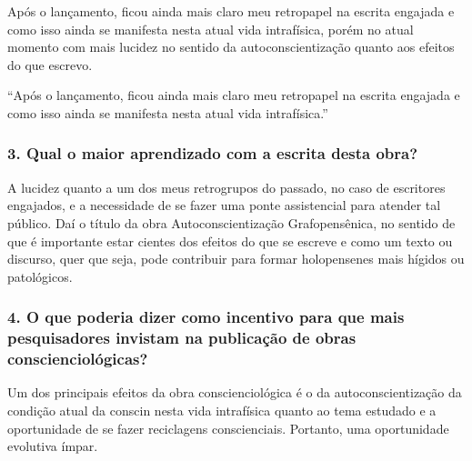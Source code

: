 \documentclass{gescons}
\begin{document}
\begin{multicols}{2}
Após o lançamento, ficou ainda mais claro meu retropapel na escrita
engajada e como isso ainda se manifesta nesta atual vida intrafísica,
porém no atual momento com mais lucidez no sentido da
autoconscientização quanto aos efeitos do que escrevo.

\begin{pullquote}
``Após o lançamento, ficou ainda mais claro meu retropapel na escrita engajada e como isso ainda se manifesta nesta atual vida intrafísica.''
\end{pullquote}

\subsubsection{3. Qual o maior aprendizado com a escrita desta obra?}

A lucidez quanto a um dos meus retrogrupos do passado, no caso de
escritores engajados, e a necessidade de se fazer uma ponte assistencial
para atender tal público. Daí o título da obra Autoconscientização
Grafopensênica, no sentido de que é importante estar cientes dos efeitos
do que se escreve e como um texto ou discurso, quer que seja, pode
contribuir para formar holopensenes mais hígidos ou patológicos.

\subsubsection{4. O que poderia dizer como incentivo para que mais pesquisadores invistam na publicação de obras conscienciológicas?}

Um dos principais efeitos da obra conscienciológica é o da
autoconscientização da condição atual da conscin nesta vida intrafísica
quanto ao tema estudado e a oportunidade de se fazer reciclagens
conscienciais. Portanto, uma oportunidade evolutiva ímpar.

    
    \end{multicols}
\end{document}
